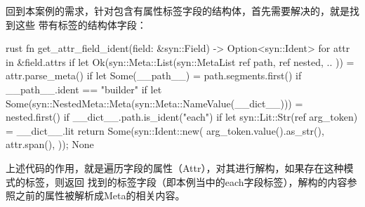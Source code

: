 回到本案例的需求，针对包含有属性标签字段的结构体，首先需要解决的，就是找到这些
带有标签的结构体字段：
\begin{code-block}{rust}
fn get_attr_field_ident(field: &syn::Field) -> Option<syn::Ident> {
    for attr in &field.attrs {
        if let Ok(syn::Meta::List(syn::MetaList {
            ref path,
            ref nested,
            ..
        })) = attr.parse_meta()
        {
            if let Some(__path__) = path.segments.first() {
                if __path__.ident == "builder" {
                    if let Some(syn::NestedMeta::Meta(syn::Meta::NameValue(__dict__))) =
                        nested.first()
                    {
                        if __dict__.path.is_ident("each") {
                            if let syn::Lit::Str(ref arg_token) = __dict__.lit {
                                return Some(syn::Ident::new(
                                    arg_token.value().as_str(),
                                    attr.span(),
                                ));
                            }
                        }
                    }
                }
            }
        }
    }
    None
}
\end{code-block}
上述代码的作用，就是遍历字段的属性（Attr），对其进行解构，如果存在这种模式的标签，则返回
找到的标签字段（即本例当中的each字段标签），解构的内容参照之前的属性被解析成Meta的相关内容。

